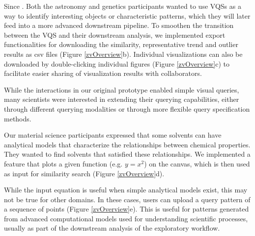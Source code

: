  Since . Both the astronomy and genetics participants wanted to use VQSs as a way to identify interesting objects or characteristic patterns, which they will later feed into a more advanced downstream pipeline. 
\npar To smoothen the transition between the VQS and their downstream analysis, we implemented export functionalities for downloading the similarity, representative trend and outlier results as csv files (Figure \ref{zvOverview}b). Individual visualizations can also be downloaded by double-clicking individual figures (Figure \ref{zvOverview}c) to facilitate easier sharing of visualization results with collaborators. 
\par While the interactions in our original prototype enabled simple visual queries, many scientists were interested in extending their querying capabilities, either through different querying modalities or through more flexible query specification methods.  

 Our material science participants expressed that some solvents can have analytical models that characterize the relationships between chemical properties. They wanted to find solvents that satisfied these relationships. We implemented a feature that plots a given function (e.g. $y=x^2$) on the canvas, which is then used as input for similarity search (Figure \ref{zvOverview}d).

 While the input equation is useful when simple analytical models exist, this may not be true for other domains. In these cases, users can upload a query pattern of a sequence of points (Figure \ref{zvOverview}e). This is useful for patterns generated from advanced computational models used for understanding scientific processes, usually as part of the downstream analysis of the exploratory workflow. %


